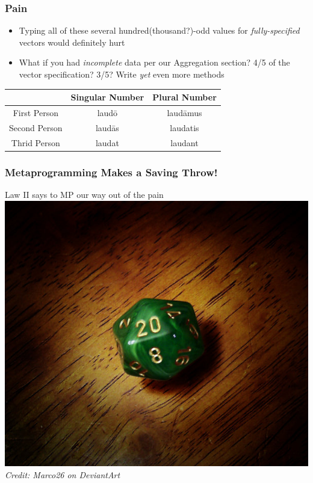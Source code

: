 \documentclass[slidestop,compress,mathserif]{beamer}
\begin{document}
\begin{frame}
		\frametitle{Pain}
		\begin{itemize}
			\item Typing all of these several hundred(thousand?)-odd values for \emph{fully-specified} vectors would definitely hurt
			\pause
			\item What if you had \emph{incomplete} data per our Aggregation section?  4/5 of the vector specification?  3/5?  Write \emph{yet} even more methods
		\end{itemize}
		\begin{center}
			\begin{tabular}{|c|c|c|}
				\hline
				  & Singular Number &  Plural Number\\
				\hline
				First Person  & laud\={o}  & laud\={a}mus\\
				Second Person & laud\={a}s & laudatis \\
				Thrid Person  & laudat     & laudant \\
				\hline
			\end{tabular}
		\end{center}
\end{frame}

\begin{frame}
	\frametitle{Metaprogramming Makes a Saving Throw!}
	\begin{center}
		Law II says to MP our way out of the pain
		\vskip 1.0cm
		\includegraphics[scale=0.25]{img/natural_20.jpg} \\
		\emph{Credit: Marco26 on DeviantArt}
	\end{center}
\end{frame}
\end{document}

